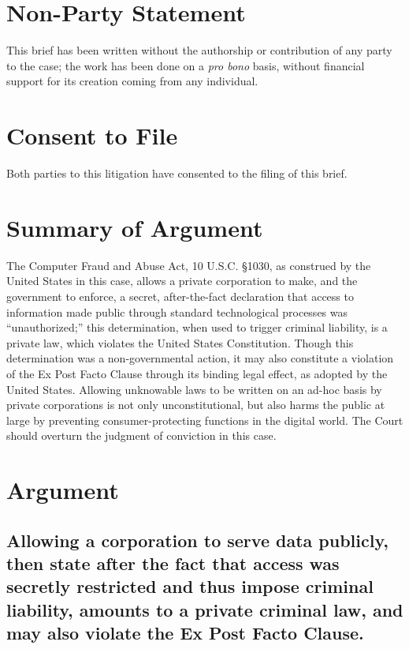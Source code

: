 \documentclass{article}
\begin{document}
	\section{Non-Party Statement} %
	
	This brief has been written without the authorship or contribution of any party to the case; the work has been done on a \emph{pro bono} basis, without financial support for its creation coming from any individual.
	
	\section{Consent to File}
	
	Both parties to this litigation have consented to the filing of this brief.
	
	\section{Summary of Argument}
	
		The Computer Fraud and Abuse Act, 10 U.S.C. \S1030, as construed by the United States in this case, allows a private corporation to make, and the government to enforce, a secret, after-the-fact declaration that access to information made public through standard technological processes was ``unauthorized;'' this determination, when used to trigger criminal liability, is a private law, which violates the United States Constitution. Though this determination was a non-governmental action, it may also constitute a violation of the Ex Post Facto Clause through its binding legal effect, as adopted by the United States. Allowing unknowable laws to be written on an ad-hoc basis by private corporations is not only unconstitutional, but also harms the public at large by preventing consumer-protecting functions in the digital world. The Court should overturn the judgment of conviction in this case.
	
	\section{Argument}
	
	\subsection{Allowing a corporation to serve data publicly, then state after the fact that access was secretly restricted and thus impose criminal liability, amounts to a private criminal law, and may also violate the Ex Post Facto Clause.}
	
\end{document}
